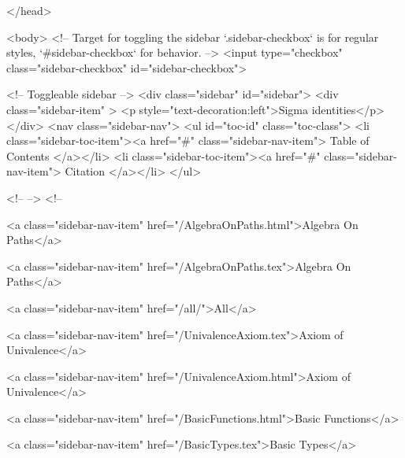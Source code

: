   
</head>




  <body>
    <!-- Target for toggling the sidebar `.sidebar-checkbox` is for regular
     styles, `#sidebar-checkbox` for behavior. -->
<input type="checkbox" class="sidebar-checkbox" id="sidebar-checkbox">

<!-- Toggleable sidebar -->
<div class="sidebar" id="sidebar">
  <div class="sidebar-item" >
    <p style="text-decoration:left">Sigma identities</p>
  </div>
  <nav class="sidebar-nav">
    <ul id="toc-id" class="toc-class">
  <li class="sidebar-toc-item"><a href="#" class="sidebar-nav-item"> Table of Contents </a></li>
  <li class="sidebar-toc-item"><a href="#" class="sidebar-nav-item"> Citation </a></li>
</ul>


    <!--  -->
    <!-- 
      
    
      
    
      
    
      
        
      
    
      
        
          <a class="sidebar-nav-item" href="/AlgebraOnPaths.html">Algebra On Paths</a>
        
      
    
      
        
          <a class="sidebar-nav-item" href="/AlgebraOnPaths.tex">Algebra On Paths</a>
        
      
    
      
        
          <a class="sidebar-nav-item" href="/all/">All</a>
        
      
    
      
        
          <a class="sidebar-nav-item" href="/UnivalenceAxiom.tex">Axiom of Univalence</a>
        
      
    
      
        
          <a class="sidebar-nav-item" href="/UnivalenceAxiom.html">Axiom of Univalence</a>
        
      
    
      
        
          <a class="sidebar-nav-item" href="/BasicFunctions.html">Basic Functions</a>
        
      
    
      
        
          <a class="sidebar-nav-item" href="/BasicTypes.tex">Basic Types</a>
        

